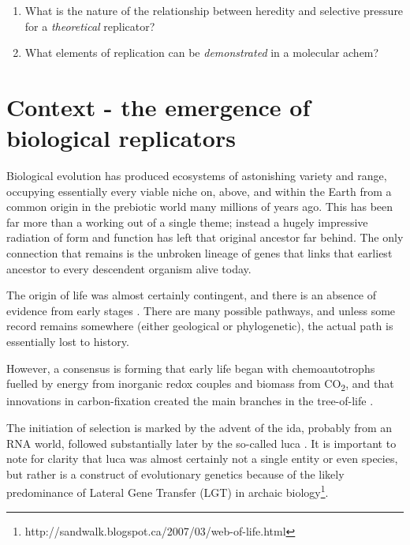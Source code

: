 \begin{enumerate}
\item What is the nature of the relationship between heredity and selective pressure for a \emph{theoretical} replicator?
\item What elements of replication can be \emph{demonstrated} in a molecular \gls{achem}?
\end{enumerate}

\section{Context - the emergence of biological replicators}\label{context}

Biological evolution has produced ecosystems of astonishing variety and range, occupying essentially every viable niche on, above, and within the Earth from a common origin in the prebiotic world many millions of years ago. This has been far more than a working out of a single theme; instead a hugely impressive radiation of form and function has left that original ancestor far behind. The only connection that remains is the unbroken lineage of genes that links that earliest ancestor to every descendent organism alive today.

The origin of life was almost certainly contingent, and there is an absence of evidence from early stages \parencite{Pross2013}. There are many possible pathways, and unless some record remains somewhere (either geological or phylogenetic), the actual path is essentially lost to history.

However, a consensus is forming that early life began with chemoautotrophs fuelled by energy from inorganic redox couples and biomass from CO\textsubscript{2}, and that innovations in carbon-fixation created the main branches in the tree-of-life \parencite{Braakman2012}. 

The initiation of selection is marked by the advent of the \gls{ida}, probably from an RNA world, followed substantially later by the so-called \gls{luca} \parencite{Yarus2011}. It is important to note for clarity that \gls{luca} was almost certainly not a single entity or even species, but rather is a construct of evolutionary genetics because of the likely predominance of Lateral Gene Transfer (LGT) in archaic biology\footnote{http://sandwalk.blogspot.ca/2007/03/web-of-life.html}. 

